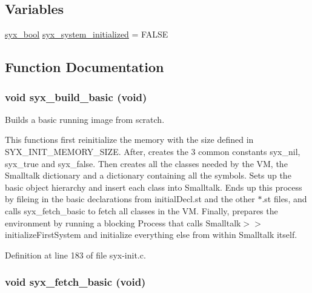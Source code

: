 \subsection*{Variables}
\begin{CompactItemize}
\item 
\hyperlink{syx-types_8h_c6dc09b276b99fa1956364359139daab}{syx\_\-bool} \hyperlink{syx-init_8c_a635a8b40fe35e17b7d2441eb9c11623}{syx\_\-system\_\-initialized} = FALSE
\end{CompactItemize}


\subsection{Function Documentation}
\hypertarget{syx-init_8c_efeb166ace07f37fd380e8e290b18368}{
\subsubsection{\setlength{\rightskip}{0pt plus 5cm}void syx\_\-build\_\-basic (void)}}
\label{syx-init_8c_efeb166ace07f37fd380e8e290b18368}


Builds a basic running image from scratch.

This functions first reinitialize the memory with the size defined in SYX\_\-INIT\_\-MEMORY\_\-SIZE. After, creates the 3 common constants syx\_\-nil, syx\_\-true and syx\_\-false. Then creates all the classes needed by the VM, the Smalltalk dictionary and a dictionary containing all the symbols. Sets up the basic object hierarchy and insert each class into Smalltalk. Ends up this process by fileing in the basic declarations from initialDecl.st and the other $\ast$.st files, and calls syx\_\-fetch\_\-basic to fetch all classes in the VM. Finally, prepares the environment by running a blocking Process that calls Smalltalk$>$$>$initializeFirstSystem and initialize everything else from within Smalltalk itself. 

Definition at line 183 of file syx-init.c.\hypertarget{syx-init_8c_7b86f133ac732b3916ff9b295a719b9c}{
\subsubsection{\setlength{\rightskip}{0pt plus 5cm}void syx\_\-fetch\_\-basic (void)}}
\label{syx-init_8c_7b86f133ac732b3916ff9b295a719b9c}




